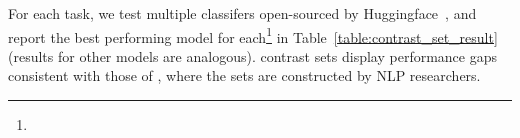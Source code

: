 For each task, we test multiple classifers open-sourced by Huggingface~\cite{Wolf2019HuggingFacesTS}, and report the best performing model for each\footnote{} in Table~\ref{table:contrast_set_result} (results for other models are analogous). \sysname contrast sets display performance gaps consistent with those of \citet{gardner2020contrast}, where the sets are constructed by NLP researchers.

\TableContrastSet




\TableAugSST
\TableAugNLI
\TableAugQQP
